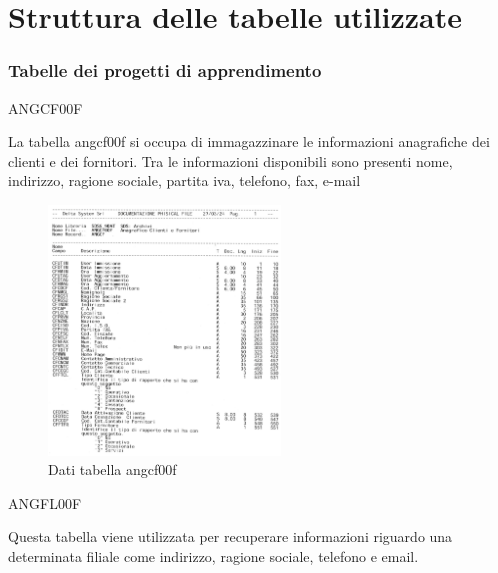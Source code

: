 \documentclass[target=bach,aauheader=,style=]{thud}
\begin{document}
\chapter{Struttura delle tabelle utilizzate}
\subsection{Tabelle dei progetti di apprendimento}
ANGCF00F

La tabella angcf00f si occupa di immagazzinare le informazioni anagrafiche dei clienti e dei fornitori. Tra le informazioni disponibili sono presenti nome, indirizzo, ragione sociale, partita iva, telefono, fax, e-mail
\begin{figure}[H]
    \begin{center}
        \includegraphics[width=0.55\textwidth, angle=90]{database/angcf00f.jpg}
    \end{center}
    \caption{Dati tabella angcf00f}
\end{figure}

ANGFL00F

Questa tabella viene utilizzata per recuperare informazioni riguardo una determinata filiale come indirizzo, ragione sociale, telefono e email.
\end{document}
